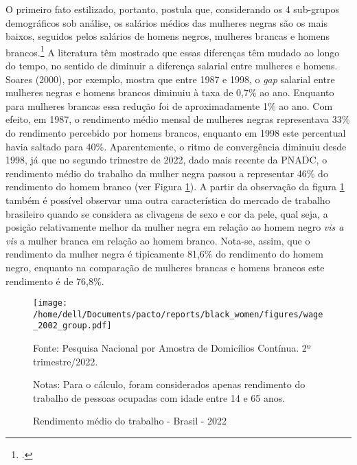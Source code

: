 \documentclass[12pt]{article}
\begin{document}
\par O primeiro fato estilizado, portanto, postula que, considerando os 4 sub-grupos de\-mo\-grá\-fi\-cos sob análise, os salários médios das mulheres negras são os mais baixos, seguidos pelos salários de homens negros, mulheres brancas e homens brancos.\footcite{soares2000perfil,campante2004desigualdade} A literatura têm mostrado que essas diferenças têm mudado ao longo do tempo, no sentido de diminuir a diferença salarial entre mulheres e homens. Soares (2000), por exemplo, mostra que entre 1987 e 1998, o \textit{gap} salarial entre mulheres negras e homens brancos diminuiu à taxa de 0,7\% ao ano. Enquanto para mulheres brancas essa redução foi de aproximadamente 1\% ao ano. Com efeito, em 1987, o rendimento médio mensal de mulheres negras representava 33\% do rendimento percebido por homens brancos, enquanto em 1998 este percentual havia saltado para 40\%. Aparentemente, o ritmo de convergência diminuiu desde 1998, já que no segundo trimestre de 2022, dado mais recente da PNADC, o rendimento médio do trabalho da mulher negra passou a representar 46\% do rendimento do homem branco (ver Figura \ref{fig:rendimento_trabalho}). A partir da observação da figura \ref{fig:rendimento_trabalho} também é possível observar uma outra característica do mercado de trabalho brasileiro quando se considera as clivagens de sexo e cor da pele, qual seja, a posição relativamente melhor da mulher negra em relação ao homem negro \textit{vis a vis} a mulher branca em relação ao homem branco. Nota-se, assim, que o rendimento da mulher negra é tipicamente 81,6\% do rendimento do homem negro, enquanto na comparação de mulheres brancas e homens brancos este rendimento é de 76,8\%.


\begin{figure}[H]
    \centering
    \caption{Rendimento médio do trabalho - Brasil - 2022}
        \texttt{[image: /home/dell/Documents/pacto/reports/black\_women/figures/wage\_2002\_group.pdf]}
    \label{fig:rendimento_trabalho}
    \begin{floatnotes}
        \item[Fonte:] Pesquisa Nacional por Amostra de Domicílios Contínua. 2º trimestre/2022.
        \item[Notas:] Para o cálculo, foram considerados apenas rendimento do trabalho de pessoas ocupadas com idade entre 14 e 65 anos.
    \end{floatnotes}
\end{figure}
\end{document}
